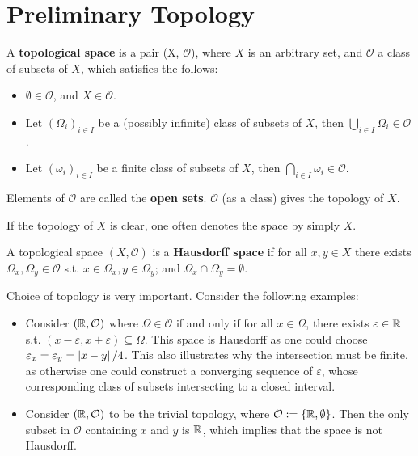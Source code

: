 \documentclass{article}
\begin{document}

\tableofcontents
\newpage

\def\open{\mathcal{O}}

\section{Preliminary Topology}

\begin{definition}
    A \textbf{topological space} is a pair (X, $\open$), where $X$ is an arbitrary set, and $\open$ a class of subsets of $X$, which satisfies the follows:
    \begin{itemize}
        \item $\emptyset \in \open$, and $X \in \open$.
        \item Let $(\Omega_i)_{i \in I}$ be a (possibly infinite) class of subsets of $X$, then $\bigcup_{i \in I} \Omega_i \in \open$.
        \item Let $(\omega_i)_{i \in I}$ be a finite class of subsets of $X$, then $\bigcap_{i \in I} \omega_i \in \open$.
    \end{itemize}
    Elements of $\open$ are called the \textbf{open sets}. $\open$ (as a class) gives the topology of $X$. 
\end{definition}

\begin{remark}
    If the topology of $X$ is clear, one often denotes the space by simply $X$. 
\end{remark}

\begin{definition}
    A topological space $(X, \open)$ is a \textbf{Hausdorff space} if for all $x, y \in X$ there exists $\Omega_x, \Omega_y \in \open$ s.t. $x \in \Omega_x, y \in \Omega_y$; and $\Omega_x \cap \Omega_y = \emptyset$.
\end{definition}

\begin{example}
    Choice of topology is very important. Consider the following examples:
    \begin{itemize}
        \item Consider $(\R, \open)$ where $\Omega \in \open$ if and only if for all $x \in \Omega$, there exists $\varepsilon \in \mathbb{R}$ s.t. $(x - \varepsilon, x + \varepsilon) \subseteq \Omega$. This space is Hausdorff as one could choose $\varepsilon_x = \varepsilon_y = \left|x - y\right|/4$. This also illustrates why the intersection must be finite, as otherwise one could construct a converging sequence of $\varepsilon$, whose corresponding class of subsets intersecting to a closed interval.
        \item Consider $(\R, \open)$ to be the trivial topology, where $\open := \{\R, \emptyset\}$. Then the only subset in $\open$ containing $x$ and $y$ is $\mathbb{R}$, which implies that the space is not Hausdorff.
    \end{itemize}
\end{example}
\end{document}
